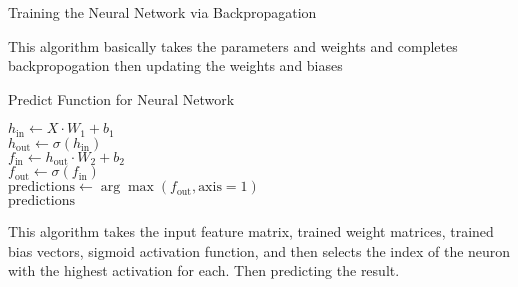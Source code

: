 \documentclass{article}
\begin{document}
\begin{algorithm}[H]
\SetAlgoLined
\caption{Training the Neural Network via Backpropagation}


\end{algorithm}
This algorithm basically takes the parameters and weights and completes backpropogation then updating the weights and biases

\begin{algorithm}[H]
\SetAlgoLined
\caption{Predict Function for Neural Network}

$h_{\text{in}} \leftarrow X \cdot W_1 + b_1$ \\
$h_{\text{out}} \leftarrow \sigma(h_{\text{in}})$ \\
$f_{\text{in}} \leftarrow h_{\text{out}} \cdot W_2 + b_2$ \\
$f_{\text{out}} \leftarrow \sigma(f_{\text{in}})$ \\

$\text{predictions} \leftarrow \arg\max(f_{\text{out}}, \text{axis}=1)$ \\

\Return $\text{predictions}$

\end{algorithm}
This algorithm takes the input feature matrix, trained weight matrices, trained bias vectors, sigmoid activation function, and then selects the index of the neuron with the highest activation for each. Then predicting the result.
\end{document}
